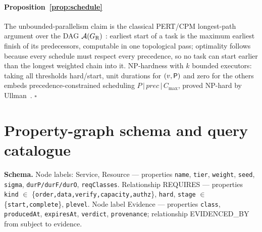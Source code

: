 \paragraph{Proposition~\ref{prop:schedule}} The unbounded-parallelism claim is the classical PERT/CPM longest-path argument over the DAG $\mathcal{A}(G_{\mathrm{R}})$ \citep{kelley1959critical}: earliest start of a task is the maximum earliest finish of its predecessors, computable in one topological pass; optimality follows because every schedule must respect every precedence, so no task can start earlier than the longest weighted chain into it. NP-hardness with $k$ bounded executors: taking all thresholds hard/start, unit durations for $(v,\mathsf{P})$ and zero for the others embeds precedence-constrained scheduling $P\,|\,\mathit{prec}\,|\,C_{\max}$, proved NP-hard by Ullman~\citep{ullman1975np}. \hfill$\square$

\section{Property-graph schema and query catalogue}
\label{app:queries}

\noindent\textbf{Schema.} Node labels: \textsf{Service}, \textsf{Resource} --- properties \texttt{name}, \texttt{tier}, \texttt{weight}, \texttt{seed}, \texttt{sigma}, \texttt{durP/durF/durO}, \texttt{reqClasses}. Relationship \textsf{REQUIRES} --- properties \texttt{kind} $\in$ \{\texttt{order,data,verify,capacity,authz}\}, \texttt{hard}, \texttt{stage} $\in$ \{\texttt{start,complete}\}, \texttt{plevel}. Node label \textsf{Evidence} --- properties \texttt{class}, \texttt{producedAt}, \texttt{expiresAt}, \texttt{verdict}, \texttt{provenance}; relationship \textsf{EVIDENCED\_BY} from subject to evidence.

